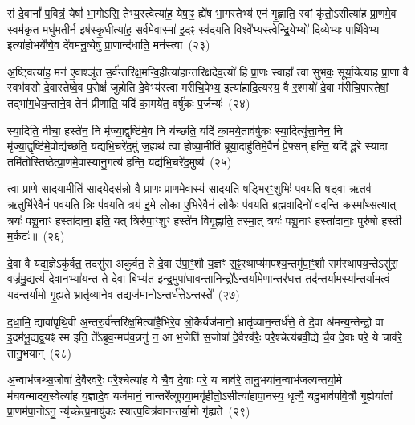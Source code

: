 सं दे॒वानां᳚ प॒वित्रं॒ येषां᳚ भा॒गो\-ऽसि॒ तेभ्य॒स्त्वेत्या॑ह॒ येषा॒ꣴ॒ ह्ये॑ष भा॒गस्तेभ्य॑ एनं गृ॒ह्णाति॒ स्वां कृ॑तो॒\-ऽसीत्या॑ह प्रा॒णमे॒व स्वम॑कृत॒ मधु॑मतीर्न॒ इष॑स्कृ॒धीत्या॑ह॒ सर्व॑मे॒वास्मा॑ इ॒दꣴ स्व॑दयति॒ विश्वे᳚भ्यस्त्वेन्द्रि॒येभ्यो॑ दि॒व्येभ्यः॒ पार्थि॑वेभ्य॒ इत्या॑हो॒भये᳚ष्वे॒व दे॑वमनु॒ष्येषु॑ प्रा॒णान्द॑धाति॒ मन॑स्त्वा~(२३)\ip

अ॒ष्ट्वित्या॑ह॒ मन॑ ए॒वाश्ञु॑त उ॒र्व॑न्तरि॑क्ष॒मन्वि॒हीत्या॑हान्तरिक्षदेव॒त्यो॑ हि प्रा॒णः स्वाहा᳚ त्वा सुभवः॒ सूर्या॒येत्या॑ह प्रा॒णा वै स्वभ॑वसो दे॒वास्तेष्वे॒व प॒रोक्षं॑ जुहोति दे॒वेभ्य॑स्त्वा मरीचि॒पेभ्य॒ इत्या॑हादि॒त्यस्य॒ वै र॒श्मयो॑ दे॒वा म॑रीचि॒पास्तेषां॒ तद्भा॑ग॒धेय॒न्ताने॒व तेन॑ प्रीणाति॒ यदि॑ का॒मये॑त॒ वर्\mbox{}षु॑कः प॒र्जन्यः॑~(२४)\ip

स्या॒दिति॒ नीचा॒ हस्ते॑न॒ नि मृ॑ज्या॒द्वृष्टि॑मे॒व नि य॑च्छति॒ यदि॑ का॒मये॒ताव॑र्\mbox{}षुकः स्या॒दित्यु॑त्ता॒नेन॒ नि मृ॑ज्या॒द्वृष्टि॑मे॒वोद्य॑च्छति॒ यद्य॑भि॒चरे॑द॒मुं ज॒ह्यथ॑ त्वा होष्या॒मीति॑ ब्रूया॒दाहु॑तिमे॒वैनं॑ प्रे॒फ्सन् ह॑न्ति॒ यदि॑ दू॒रे स्यादा तमि॑तोस्तिष्ठेत्प्रा॒णमे॒वास्या॑नु॒गत्य॑ हन्ति॒ यद्य॑भि॒चरे॑द॒मुष्य॑~(२५)\ip

त्वा॒ प्रा॒णे सा॑दया॒मीति॑ सादये॒दस॑न्नो॒ वै प्रा॒णः प्रा॒णमे॒वास्य॑ सादयति ष॒ड्भिर॒ꣳ॒शुभिः॑ पवयति॒ षड्वा ऋ॒तव॑ ऋ॒तुभि॑रे॒वैनं॑ पवयति॒ त्रिः प॑वयति॒ त्रय॑ इ॒मे लो॒का ए॒भिरे॒वैनं॑ लो॒कैः प॑वयति ब्रह्मवा॒दिनो॑ वदन्ति॒ कस्मा᳚थ्स॒त्यात् त्रयः॑ पशू॒नाꣳ हस्ता॑दाना॒ इति॒ यत् त्रिरु॑पा॒ꣳ॒शुꣳ हस्ते॑न विगृ॒ह्णाति॒ तस्मा॒त् त्रयः॑ पशू॒नाꣳ हस्ता॑दानाः॒ पुरु॑षो ह॒स्ती म॒र्कटः॑॥~(२६)\ip

{\anuvakamend[{माध्य॑न्दिनम॒ष्टाव॑ष्टावे॒ष मन॑स्त्वा प॒र्जन्यो॒\-ऽमुष्य॒ पुरु॑षो॒ द्वे च॑}]}

दे॒वा वै यद्य॒ज्ञे\-ऽकु॑र्वत॒ तदसु॑रा अकुर्वत॒ ते दे॒वा उ॑पा॒ꣳ॒शौ य॒ज्ञꣳ स॒ꣴ॒स्थाप्य॑मपश्य॒न्तमु॑पा॒ꣳ॒शौ सम॑स्थापय॒न्ते\-ऽसु॑रा॒ वज्र॑मु॒द्यत्य॑ दे॒वान॒भ्या॑यन्त॒ ते दे॒वा बिभ्य॑त॒ इन्द्र॒मुपा॑धाव॒न्तानिन्द्रो᳚\-ऽन्तर्या॒मेणा॒न्तर॑धत्त॒ तद॑न्तर्या॒मस्या᳚न्तर्याम॒त्वं यद॑न्तर्या॒मो गृ॒ह्यते॒ भ्रातृ॑व्याने॒व तद्यज॑मानो॒\-ऽन्तर्ध॑त्ते॒\-ऽन्तस्ते᳚~(२७)\ip

द॒धा॒मि॒ द्यावा॑\-पृथि॒वी अ॒न्तरु॒र्व॑न्तरि॑क्ष॒मित्या॑है॒भिरे॒व लो॒कैर्यज॑मानो॒ भ्रातृ॑व्यान॒न्तर्ध॑त्ते॒ ते दे॒वा अ॑मन्य॒न्तेन्द्रो॒ वा इ॒दम॑भू॒द्यद्व॒यꣴ स्म इति॒ ते᳚\-ऽब्रुव॒न्मघ॑व॒न्ननु॑ न॒ आ भ॒जेति॑ स॒जोषा॑ दे॒वैरव॑रैः॒ परै॒श्चेत्य॑ब्रवी॒द्ये चै॒व दे॒वाः परे॒ ये चाव॑रे॒ तानु॒भयान्॑~(२८)\ip

अ॒न्वाभ॑जथ्स॒जोषा॑ दे॒वैरव॑रैः॒ परै॒श्चेत्या॑ह॒ ये चै॒व दे॒वाः परे॒ य चाव॑रे॒ तानु॒भया॑न॒न्वाभ॑जत्यन्तर्या॒मे म॑घवन्मादय॒स्वेत्या॑ह य॒ज्ञादे॒व यज॑मानं॒ नान्तरे᳚त्युपया॒मगृ॑हीतो॒\-ऽसीत्या॑हापा॒नस्य॒ धृत्यै॒ यदु॒भाव॑पवि॒त्रौ गृ॒ह्येया॑तां प्रा॒णम॑पा॒नो\-ऽनु॒ न्यृ॑च्छेत्प्र॒मायु॑कः स्यात्प॒वित्र॑वानन्तर्या॒मो गृ॑ह्यते~(२९)\ip

